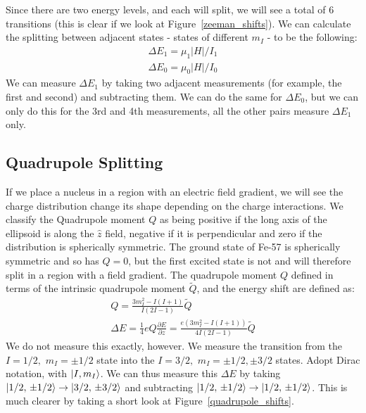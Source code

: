 \documentclass[reprint, nobibnotes, amssymb, amsmath, amsfonts, mathtools, mathrsfs, floatfix]{revtex4-1}
\begin{document}
        Since there are two energy levels, and each will split, we will see a total of 6 transitions (this is clear if we look at Figure~\ref{zeeman_shifts}).  We can calculate the splitting between adjacent states - states of different $m_I$ - to be the following:
        \begin{gather}
          \Delta E_1 = \mu_1|H|/I_1 \label{E1_zeeman_shift} \\
          \Delta E_0 = \mu_0|H|/I_0 \label{E2_zeeman_shift}
        \end{gather}
        We can measure $\Delta E_{1}$ by taking two adjacent measurements (for example, the first and second) and subtracting them.  We can do the same for $\Delta E_{0}$, but we can only do this for the 3rd and 4th measurements, all the other pairs measure $\Delta E_1$ only.

      \subsection{Quadrupole Splitting}
        If we place a nucleus in a region with an electric field gradient, we will see the charge distribution change its shape depending on the charge interactions.  We classify the Quadrupole moment $Q$ as being positive if the long axis of the ellipsoid is along the $\hat{z}$ field, negative if it is perpendicular and zero if the distribution is spherically symmetric.  The ground state of Fe-57 is spherically symmetric and so has $Q = 0$, but the first excited state is not and will therefore split in a region with a field gradient.  The quadrupole moment $Q$ defined in terms of the intrinsic quadrupole moment $\tilde{Q}$, and the energy shift are defined as:
        \begin{gather}
          Q = \frac{3 m_I^2 - I(I+1)}{I(2I-1)}\tilde{Q} \label{quadrupole_moment} \\
          \Delta E = \frac{1}{4}eQ\frac{\partial E}{\partial z} = \frac{e\left(3 m_I^2 - I(I+1)\right)}{4I(2I-1)}\tilde{Q} \label{quadrupole_shift}
        \end{gather}
        We do not measure this exactly, however.  We measure the transition from the $I = 1/2,\,\, m_I = \pm1/2$ state into the $I = 3/2,\,\, m_I = \pm1/2, \pm3/2$ states.  Adopt Dirac notation, with $\ket{I, m_I}$.  We can thus measure this $\Delta E$ by taking $\ket{1/2,\,\pm1/2} \rightarrow \ket{3/2,\,\pm3/2}$ and subtracting $\ket{1/2,\,\pm1/2} \rightarrow \ket{1/2,\,\pm1/2}$.  This is much clearer by taking a short look at Figure~\ref{quadrupole_shifts}.
\end{document}
